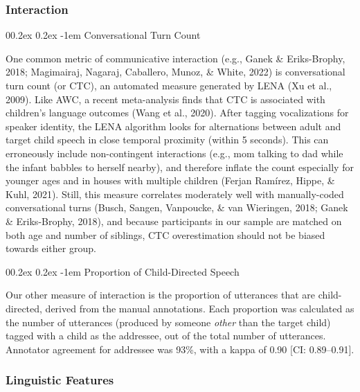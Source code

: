 \documentclass[
  man]{apa6}
\makeatletter
\let\oldparagraph\paragraph
\renewcommand{\paragraph}[1]{\oldparagraph{#1}\mbox{}}
\renewcommand{\paragraph}{\@startsection{paragraph}{4}{\parindent}%
  {0\baselineskip \@plus 0.2ex \@minus 0.2ex}%
  {-1em}%
  {\normalfont\normalsize\bfseries\itshape\typesectitle}}
\makeatother
\begin{document}
\hypertarget{interaction}{%
\subsubsection{Interaction}\label{interaction}}

\hypertarget{conversational-turn-count}{%
\paragraph{Conversational Turn Count}\label{conversational-turn-count}}

One common metric of communicative interaction (e.g., Ganek \& Eriks-Brophy, 2018; Magimairaj, Nagaraj, Caballero, Munoz, \& White, 2022) is conversational turn count (or CTC), an automated measure generated by LENA (Xu et al., 2009). Like AWC, a recent meta-analysis finds that CTC is associated with children's language outcomes (Wang et al., 2020). After tagging vocalizations for speaker identity, the LENA algorithm looks for alternations between adult and target child speech in close temporal proximity (within 5 seconds). This can erroneously include non-contingent interactions (e.g., mom talking to dad while the infant babbles to herself nearby), and therefore inflate the count especially for younger ages and in houses with multiple children (Ferjan Ramírez, Hippe, \& Kuhl, 2021). Still, this measure correlates moderately well with manually-coded conversational turns (Busch, Sangen, Vanpoucke, \& van Wieringen, 2018; Ganek \& Eriks-Brophy, 2018), and because participants in our sample are matched on both age and number of siblings, CTC overestimation should not be biased towards either group.

\hypertarget{proportion-of-child-directed-speech}{%
\paragraph{Proportion of Child-Directed Speech}\label{proportion-of-child-directed-speech}}

Our other measure of interaction is the proportion of utterances that are child-directed, derived from the manual annotations. Each proportion was calculated as the number of utterances (produced by someone \emph{other} than the target child) tagged with a child as the addressee, out of the total number of utterances. Annotator agreement for addressee was 93\%, with a kappa of 0.90 {[}CI: 0.89--0.91{]}.

\hypertarget{linguistic-features}{%
\subsubsection{Linguistic Features}\label{linguistic-features}}
\end{document}
